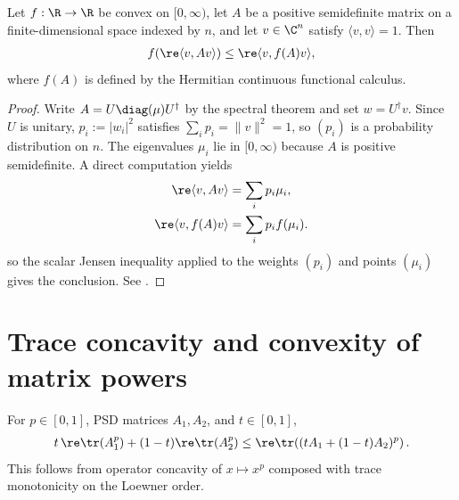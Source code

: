 \begin{lemma}\label{lem:diagonal_jensen_of_convexOn}
    \leanok
    Let $f:\R\to\R$ be convex on $[0,\infty)$, let $A$ be a positive
    semidefinite matrix on a finite-dimensional space indexed by $n$, and let
    $v\in\C^n$ satisfy $\langle v,v\rangle=1$. Then
    \begin{align}
        f\!\left(\re\langle v,Av\rangle\right)
        \le\re\langle v,f(A)v\rangle,
        \notag
    \end{align}
    where $f(A)$ is defined by the Hermitian continuous functional calculus.
\end{lemma}

\begin{proof}\leanok
    Write $A=U\diag(\mu)U^\dagger$ by the spectral theorem and set
    $w=U^\dagger v$. Since $U$ is unitary,
    $p_i:=\lvert w_i\rvert^2$ satisfies
    $\sum_i p_i=\lVert v\rVert^2=1$, so $(p_i)$ is a probability distribution
    on $n$. The eigenvalues $\mu_i$ lie in $[0,\infty)$ because $A$ is positive
    semidefinite. A direct computation yields
    \begin{align}
        \re\langle v,Av\rangle
        &=\sum_i p_i\mu_i,
        \notag\\
        \re\langle v,f(A)v\rangle
        &=\sum_i p_i f(\mu_i).
        \notag
    \end{align}
    so the scalar Jensen inequality applied to the weights $(p_i)$ and points
    $(\mu_i)$ gives the conclusion. See
    \cite[Chapter~V]{Bhatia1997Matrix}.
\end{proof}

\section{Trace concavity and convexity of matrix powers}

\begin{theorem}\label{thm:trace_rpow_concave}
    \leanok
    For $p\in[0,1]$, PSD matrices $A_1,A_2$, and $t\in[0,1]$,
    \begin{align}
        t\,\re\tr(A_1^p)+(1-t)\re\tr(A_2^p)
        \le
        \re\tr\!\left((tA_1+(1-t)A_2)^p\right).
        \notag
    \end{align}
    This follows from operator concavity of $x\mapsto x^p$ composed with trace
    monotonicity on the Loewner order.
\end{theorem}

